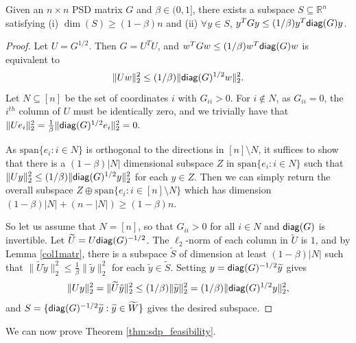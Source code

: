 \begin{lemma}
\label{diagdom}
Given an $n\times n$ PSD matrix $G$ and $\beta\in(0,1]$, there exists a subspace $S\subseteq \mathbb{R}^n$ satisfying (i) $\dim(S)\ge (1-\beta) n$
and (ii) $\forall y\in S$, $y^TGy\le (1/\beta) y^T\mathsf{diag}(G)y$.
\end{lemma}
\begin{proof}
Let $U=G^{1/2}$. Then $G=U^TU$, and $w^TGw\le (1/\beta)w^T\mathsf{diag}(G)w$ is equivalent to
\[ \|Uw\|_2^2\le (1/\beta)\|\mathsf{diag}(G)^{1/2}w\|_2^2.\]
Let $N \subseteq [n]$ be the set of coordinates $i$ with $G_{ii} > 0$. For $i \notin N$, as $G_{ii}=0$, the $i^{th}$ column of $U$ must be identically zero, and we trivially have that  $\|Ue_i\|_2^2= \frac{1}{\beta}\|\mathsf{diag}(G)^{1/2}e_i\|_2^2=0.$

As $\textrm{span}\{e_i:i\in N\}$ is orthogonal to the directions in $[n]\setminus N$, it 
suffices to show that there is a $(1-\beta)|N|$ dimensional subspace $Z$ in $\textrm{span}\{e_i:i\in N\}$ such that $ \|Uy\|_2^2 \leq  (1/\beta)  \|\mathsf{diag}(G)^{1/2}y\|_2^2$ for each $y \in Z$. Then we can simply return the overall subspace $Z \oplus \textrm{span}\{e_i: i \in [n]\setminus N\}$ which has dimension $(1-\beta)|N| + (n-|N|) \geq (1-\beta)n$.

So let us assume that $N=[n]$, so that  $G_{ii} > 0$ for all $i\in N$ and $\mathsf{diag}(G)$ is invertible.
Let $\widetilde{U}=U \mathsf{diag}(G)^{-1/2} $. The $\ell_2$-norm of each column in $\widetilde{U}$ is $1$, and by Lemma \ref{col1matr}, there is a subspace $\widetilde{S}$ of dimension at least $(1-\beta)|N|$ such that $\|\widetilde{U}\widetilde{y}\|_2^2 \leq  \frac{1}{\beta} \|\widetilde{y}\|_2^2$ for each $\widetilde{y}\in \widetilde{S}$.
Setting $y=\mathsf{diag}(G)^{-1/2}\widetilde{y}$ gives
 \[ \|U y \|_2^2 =  \|\widetilde{U}\tilde{y}\|_2^2 \leq (1/\beta) \|\widetilde{y}\|_2^2 = (1/\beta) \|\mathsf{diag}(G)^{1/2} y\|_2^2, \]  
and $S = \{\mathsf{diag}(G)^{-1/2}\widetilde{y}: \widetilde{y}\in \widetilde{W}\}$ gives the desired subspace. 
\end{proof}
We can now prove Theorem \ref{thm:sdp_feasibility}.
